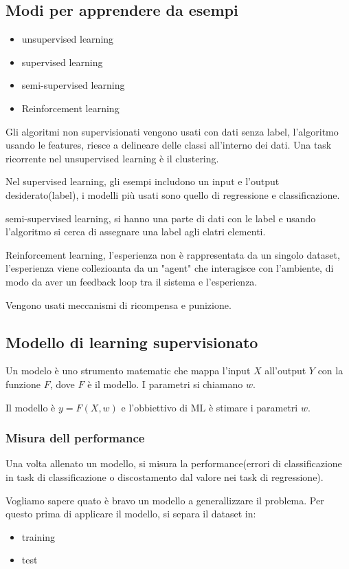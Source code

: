 \subsection{Modi per apprendere da esempi}
\begin{itemize}
    \item unsupervised learning
    \item supervised learning
    \item semi-supervised learning
    \item Reinforcement learning
\end{itemize}

Gli algoritmi non supervisionati vengono usati con dati senza label, l'algoritmo usando le features,
riesce a delineare delle classi all'interno dei dati.
Una task ricorrente nel unsupervised learning è il clustering.


Nel supervised learning, gli esempi includono un input e l'output desiderato(label), i modelli
più usati sono quello di regressione e classificazione.

semi-supervised learning, si hanno una parte di dati con le label e usando l'algoritmo si cerca di assegnare una label agli elatri elementi.



Reinforcement learning, l'esperienza non è rappresentata da un singolo dataset,
l'esperienza viene collezioanta da un "agent" che interagisce con l'ambiente, di modo
da aver un feedback loop tra il sistema e l'esperienza.

Vengono usati meccanismi di ricompensa e punizione.

\subsection{Modello di learning supervisionato}
Un modelo è uno strumento matematic che mappa l'input $X$ all'output $Y$
con la funzione $F$, dove $F$ è il modello.
I parametri si chiamano $w$.

Il modello è $y=F(X,w)$ e l'obbiettivo di ML è stimare i parametri $w$.

\subsubsection{Misura dell performance}
Una volta allenato un modello, si misura la performance(errori di classificazione
in task di classificazione o discostamento dal valore nei task di regressione).

Vogliamo sapere quato è bravo un modello a generallizzare il problema.
Per questo prima di applicare il modello, si separa il dataset in:
\begin{itemize}
    \item training
    \item test
\end{itemize}

